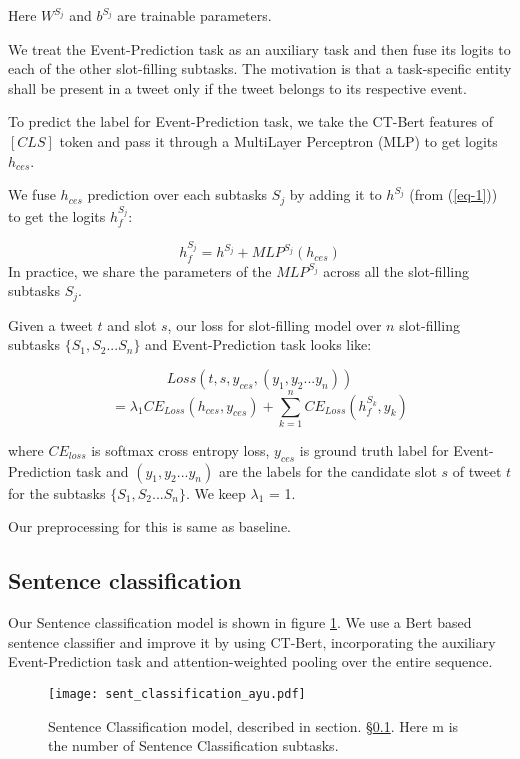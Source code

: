 \documentclass[11pt,a4paper]{article}
\begin{document}
Here $W^{S_j}$ and $b^{S_j}$ are trainable parameters.

We treat the Event-Prediction task as an auxiliary task and then fuse its logits to each of the other slot-filling subtasks. The motivation is that a task-specific entity shall be present in a tweet only if the tweet belongs to its respective event.

To predict the label for Event-Prediction task, we take the CT-Bert features of $[CLS]$ token and pass it through a MultiLayer Perceptron (MLP) to get logits $h_{ces}$.

We fuse $h_{ces}$ prediction over each subtasks ${S_j}$ by adding it to $h^{S_j}$ (from (\ref{eq-1})) to get the logits $h_f^{S_j}$:

\begin{equation}
h_f^{S_j} = h^{S_j} + MLP^{S_j}(h_{ces})
\end{equation}
In practice, we share the parameters of the $MLP^{S_j}$ across all the slot-filling subtasks $S_j$.

Given a tweet $t$ and slot $s$, our loss for slot-filling model over $n$ slot-filling subtasks $\{S_1, S_2 ... S_n\}$ and Event-Prediction task looks like:


$$Loss(t, s, y_{ces}, (y_1, y_2 ... y_n))$$
\begin{equation}
= \lambda_1 CE_{Loss}(h_{ces}, y_{ces}) + \sum_{k=1}^{n}CE_{Loss}(h_f^{S_k}, y_k)
\end{equation}


where $CE_{loss}$ is softmax cross entropy loss, $y_{ces}$ is ground truth label for Event-Prediction task and $(y_1, y_2 ... y_n)$ are the labels for the candidate slot $s$ of tweet $t$ for the subtasks $\{S_1, S_2 ... S_n\}$. We keep $\lambda_1$ = 1.

Our preprocessing for this is same as baseline.

\subsection{Sentence classification}\label{sentence_classification_subsection}

Our Sentence classification model is shown in figure \ref{fig:model_sent_class}. We use a Bert based sentence classifier and improve it by using CT-Bert, incorporating the auxiliary Event-Prediction task and attention-weighted pooling over the entire sequence.

\begin{figure}
\centering
\texttt{[image: sent\_classification\_ayu.pdf]}
    \caption{Sentence Classification model, described in section. \S\ref{sentence_classification_subsection}. Here m is the number of Sentence Classification subtasks. }
    \label{fig:model_sent_class}
\end{figure}
\end{document}

